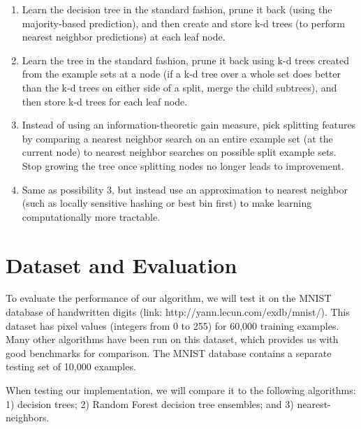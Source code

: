 \documentclass[10pt]{article}
\begin{document}
\begin{enumerate}
	\item Learn the decision tree in the standard fashion, prune it back (using the majority-based prediction), and then create and store k-d trees (to perform nearest neighbor predictions) at each leaf node.
	\item Learn the tree in the standard fashion, prune it back using k-d trees created from the example sets at a node (if a k-d tree over a whole set does better than the k-d trees on either side of a split, merge the child subtrees), and then store k-d trees for each leaf node. 
	\item Instead of using an information-theoretic gain measure, pick splitting features by comparing a nearest neighbor search on an entire example set (at the current node) to nearest neighbor searches on possible split example sets.  Stop growing the tree once splitting nodes no longer leads to improvement.
	\item Same as possibility 3, but instead use an approximation to nearest neighbor (such as locally sensitive hashing or best bin first) to make learning computationally more tractable.

\end{enumerate}

\section{Dataset and Evaluation}
To evaluate the performance of our algorithm, we will test it on the MNIST database of handwritten digits (link: http://yann.lecun.com/exdb/mnist/). This dataset has pixel values (integers from 0 to 255) for 60,000 training examples. Many other algorithms have been run on this dataset, which provides us with good benchmarks for comparison. The MNIST database contains a separate testing set of 10,000 examples.

When testing our implementation, we will compare it to the following algorithms:  1) decision trees; 2) Random Forest decision tree ensembles; and 3) nearest-neighbors.
	
\end{document}
